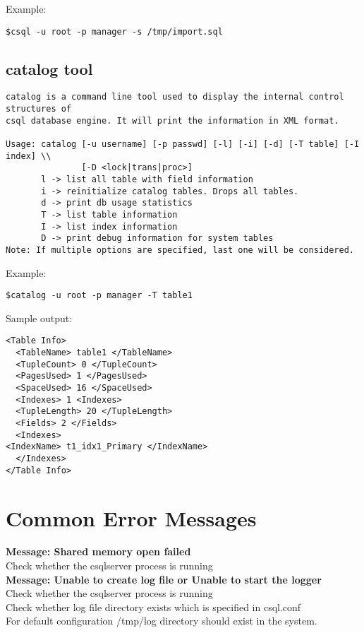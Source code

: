\documentclass[12pt]{article}
\begin{document}
Example: 
\begin{verbatim}
$csql -u root -p manager -s /tmp/import.sql
\end{verbatim}

\subsection{catalog tool}
\label{catalogtool}
\begin{verbatim}
catalog is a command line tool used to display the internal control structures of 
csql database engine. It will print the information in XML format.

Usage: catalog [-u username] [-p passwd] [-l] [-i] [-d] [-T table] [-I index] \\
               [-D <lock|trans|proc>]
       l -> list all table with field information
       i -> reinitialize catalog tables. Drops all tables.
       d -> print db usage statistics
       T -> list table information
       I -> list index information
       D -> print debug information for system tables
Note: If multiple options are specified, last one will be considered.
\end{verbatim}

Example: 
\begin{verbatim}
$catalog -u root -p manager -T table1
\end{verbatim}
Sample output:
\begin{verbatim}
<Table Info> 
  <TableName> table1 </TableName>
  <TupleCount> 0 </TupleCount>
  <PagesUsed> 1 </PagesUsed>
  <SpaceUsed> 16 </SpaceUsed>
  <Indexes> 1 <Indexes>
  <TupleLength> 20 </TupleLength>
  <Fields> 2 </Fields>
  <Indexes>
<IndexName> t1_idx1_Primary </IndexName>
  </Indexes>
</Table Info> 
\end{verbatim}

\section{Common Error Messages}
\label{errormessages}
\textbf {Message: Shared memory open failed}  \\
Check whether the csqlserver process is running \\

\textbf {Message: Unable to create log file or Unable to start the logger}\\
Check whether the csqlserver process is running \\
Check whether log file directory exists which is specified in csql.conf \\
For default configuration /tmp/log directory should exist in the system.

\end{document}
